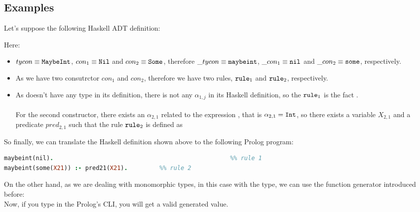 \subsection{Examples} \label{ch:monomorphic-types-examples}
\begin{example}[MaybeInt]
	Let's suppose the following Haskell ADT definition:
	
	Here:
	\begin{itemize}
		\item $tycon \equiv \texttt{MaybeInt}$, $con_1 \equiv \texttt{Nil}$ and $con_2 \equiv \texttt{Some}$, therefore $\_tycon \equiv \texttt{maybeint}$, $\_con_1 \equiv \texttt{nil}$ and $\_con_2 \equiv \texttt{some}$, respectively.
		\item As we have two consutrctor $con_1$ and $con_2$, therefore we have two rules, $\texttt{rule}_1$ and $\texttt{rule}_2$, respectively.
		\item As  doesn't have any type in its definition, there is not any $\alpha_{1,j}$ in its Haskell definition, so the $\texttt{rule}_1$ is the fact .\\\\
		      For the second constructor, there exists an $\alpha_{2,1}$ related to the expression , that is $\alpha_{2,1} = \texttt{Int}$, so there exists a variable $X_{2,1}$ and a predicate $pred_{2,1}$ such that the rule $\texttt{rule}_2$ is defined as 
	\end{itemize}
	So finally, we can translate the Haskell definition shown above to the following Prolog program:\\
	\begin{lstlisting}[language=Prolog]
maybeint(nil).													%% rule 1
maybeint(some(X21)) :- pred21(X21).			%% rule 2
	\end{lstlisting}
	On the other hand, as we are dealing with monomorphic types, in this case with the  type, we can use the  function generator introduced before:\\
	
	Now, if you type  in the Prolog's CLI, you will get a valid  generated value.\\
\end{example}

